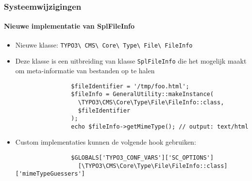
\begin{frame}[fragile]
	\frametitle{Systeemwijzigingen}
	\framesubtitle{Nieuwe implementatie van SplFileInfo}

	\lstset{basicstyle=\smaller\ttfamily}

	\begin{itemize}

		\item Nieuwe klasse:
			\texttt{TYPO3\textbackslash
				CMS\textbackslash
				Core\textbackslash
				Type\textbackslash
				File\textbackslash
				FileInfo}

		\item Deze klasse is een uitbreiding van klasse \texttt{SplFileInfo} die het mogelijk 
			maakt om meta-informatie van bestanden op te halen

			\begin{lstlisting}
				$fileIdentifier = '/tmp/foo.html';
				$fileInfo = GeneralUtility::makeInstance(
				  \TYPO3\CMS\Core\Type\File\FileInfo::class,
				  $fileIdentifier
				);
				echo $fileInfo->getMimeType(); // output: text/html
			\end{lstlisting}

		\item Custom implementaties kunnen de volgende hook gebruiken:

			\begin{lstlisting}
				$GLOBALS['TYPO3_CONF_VARS']['SC_OPTIONS']
				  [\TYPO3\CMS\Core\Type\File\FileInfo::class]['mimeTypeGuessers']
			\end{lstlisting}

	\end{itemize}

\end{frame}


